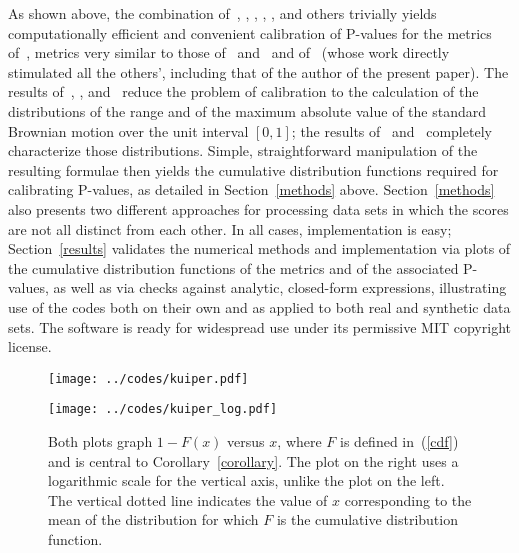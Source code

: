 \documentclass[12pt]{article}
\begin{document}
As shown above, the combination of~\citet{feller}, \citet{darling-siegert},
\citet{delgado}, \citet{diebolt}, \citet{stute}, and others trivially yields
computationally efficient and convenient calibration of P-values
for the metrics of~\citet{tygert_full}, metrics very similar
to those of~\citet{kolmogorov} and~\citet{smirnov} and of~\citet{kuiper}
(whose work directly stimulated all the others', including that
of the author of the present paper).
The results of~\citet{delgado}, \citet{diebolt}, and~\citet{stute}
reduce the problem of calibration to the calculation
of the distributions of the range and of the maximum absolute value
of the standard Brownian motion over the unit interval $[0, 1]$;
the results of~\citet{feller} and~\citet{darling-siegert}
completely characterize those distributions.
Simple, straightforward manipulation of the resulting formulae
then yields the cumulative distribution functions required
for calibrating P-values, as detailed in Section~\ref{methods} above.
Section~\ref{methods} also presents two different approaches for processing
data sets in which the scores are not all distinct from each other.
In all cases, implementation is easy; Section~\ref{results} validates
the numerical methods and implementation via plots
of the cumulative distribution functions of the metrics
and of the associated P-values, as well as via checks
against analytic, closed-form expressions, illustrating use of the codes
both on their own and as applied to both real and synthetic data sets.
The software is ready for widespread use
under its permissive MIT copyright license.



\newlength{\imsize}
\setlength{\imsize}{.48\textwidth}
\newlength{\imsized}
\setlength{\imsized}{.59\textwidth}


\begin{figure}
\begin{center}
\parbox{\imsize}{\texttt{[image: ../codes/kuiper.pdf]}}
\quad
\parbox{\imsize}{\texttt{[image: ../codes/kuiper\_log.pdf]}}
\end{center}
\vspace{-.125in}
\caption{Both plots graph $1 - F(x)$ versus $x$, where
$F$ is defined in~(\ref{cdf}) and is central to Corollary~\ref{corollary}.
The plot on the right uses a logarithmic scale for the vertical axis,
unlike the plot on the left. The vertical dotted line indicates
the value of $x$ corresponding to the mean of the distribution
for which $F$ is the cumulative distribution function.}
\vspace{.5in}
\label{kuiper_plot}
\end{figure}
\end{document}
